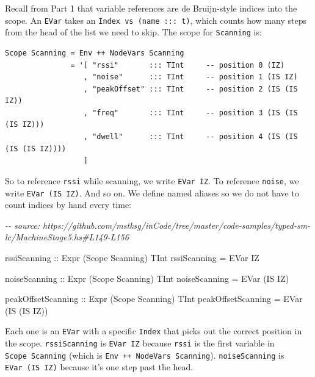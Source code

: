 \documentclass[]{article}
\newenvironment{Shaded}{}{}
\newcommand{\CommentTok}[1]{\textcolor[rgb]{0.38,0.63,0.69}{\textit{#1}}}
\newcommand{\DataTypeTok}[1]{\textcolor[rgb]{0.56,0.13,0.00}{#1}}
\newcommand{\NormalTok}[1]{#1}
\newcommand{\OtherTok}[1]{\textcolor[rgb]{0.00,0.44,0.13}{#1}}
\begin{document}
Recall from Part 1 that variable references are de Bruijn-style indices into the
scope. An \texttt{EVar} takes an \texttt{Index\ vs\ (name\ :::\ t)}, which
counts how many steps from the head of the list we need to skip. The scope for
\texttt{Scanning} is:

\begin{verbatim}
Scope Scanning = Env ++ NodeVars Scanning
               = '[ "rssi"       ::: TInt     -- position 0 (IZ)
                  , "noise"      ::: TInt     -- position 1 (IS IZ)
                  , "peakOffset" ::: TInt     -- position 2 (IS (IS IZ))
                  , "freq"       ::: TInt     -- position 3 (IS (IS (IS IZ)))
                  , "dwell"      ::: TInt     -- position 4 (IS (IS (IS (IS IZ))))
                  ]
\end{verbatim}

So to reference \texttt{rssi} while scanning, we write \texttt{EVar\ IZ}. To
reference \texttt{noise}, we write \texttt{EVar\ (IS\ IZ)}. And so on. We define
named aliases so we do not have to count indices by hand every time:

\begin{Shaded}
\begin{Highlighting}[]
\CommentTok{{-}{-} source: https://github.com/mstksg/inCode/tree/master/code{-}samples/typed{-}sm{-}lc/MachineStage5.hs\#L149{-}L156}

\OtherTok{rssiScanning ::} \DataTypeTok{Expr}\NormalTok{ (}\DataTypeTok{Scope} \DataTypeTok{Scanning}\NormalTok{) }\DataTypeTok{TInt}
\NormalTok{rssiScanning }\OtherTok{=} \DataTypeTok{EVar} \DataTypeTok{IZ}

\OtherTok{noiseScanning ::} \DataTypeTok{Expr}\NormalTok{ (}\DataTypeTok{Scope} \DataTypeTok{Scanning}\NormalTok{) }\DataTypeTok{TInt}
\NormalTok{noiseScanning }\OtherTok{=} \DataTypeTok{EVar}\NormalTok{ (}\DataTypeTok{IS} \DataTypeTok{IZ}\NormalTok{)}

\OtherTok{peakOffsetScanning ::} \DataTypeTok{Expr}\NormalTok{ (}\DataTypeTok{Scope} \DataTypeTok{Scanning}\NormalTok{) }\DataTypeTok{TInt}
\NormalTok{peakOffsetScanning }\OtherTok{=} \DataTypeTok{EVar}\NormalTok{ (}\DataTypeTok{IS}\NormalTok{ (}\DataTypeTok{IS} \DataTypeTok{IZ}\NormalTok{))}
\end{Highlighting}
\end{Shaded}

Each one is an \texttt{EVar} with a specific \texttt{Index} that picks out the
correct position in the scope. \texttt{rssiScanning} is \texttt{EVar\ IZ}
because \texttt{rssi} is the first variable in \texttt{Scope\ Scanning} (which
is \texttt{Env\ ++\ NodeVars\ Scanning}). \texttt{noiseScanning} is
\texttt{EVar\ (IS\ IZ)} because it's one step past the head.
\end{document}
